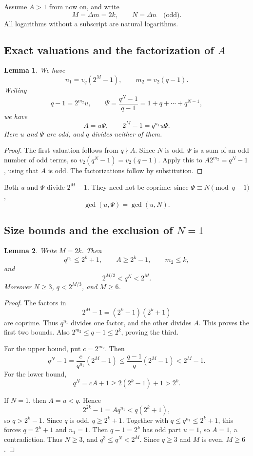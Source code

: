 \documentclass[11pt]{article}
\newtheorem{lemma}{Lemma}
\begin{document}
Assume $A>1$ from now on, and write
\[
M=\Delta m=2k,\qquad N=\Delta n\quad\text{(odd)}.
\]
All logarithms without a subscript are natural logarithms.

\subsection{\texorpdfstring{Exact valuations and the factorization of $A$}{Exact valuations and the factorization of A}}

\begin{lemma}\label{lem:valuations}
We have
\[
n_1=v_q(2^M-1),\qquad m_2=v_2(q-1).
\]
Writing
\[
q-1=2^{m_2}u,\qquad
\Psi=\frac{q^N-1}{q-1}=1+q+\cdots+q^{N-1},
\]
we have
\[
\boxed{A=u\Psi,\qquad 2^M-1=q^{n_1}u\Psi.}
\]
Here $u$ and $\Psi$ are odd, and $q$ divides neither of them.
\end{lemma}
\begin{proof}
The first valuation follows from $q\nmid A$.
Since $N$ is odd, $\Psi$ is a sum of an odd number of odd terms,
so $v_2(q^N-1)=v_2(q-1)$.
Apply this to $A2^{m_2}=q^N-1$, using that $A$ is odd.
The factorizations follow by substitution.
\end{proof}

Both $u$ and $\Psi$ divide $2^M-1$. They need not be coprime:
since $\Psi\equiv N\pmod{q-1}$,
\[
\gcd(u,\Psi)=\gcd(u,N).
\]
\subsection{\texorpdfstring{Size bounds and the exclusion of $N=1$}{Size bounds and the exclusion of N=1}}

\begin{lemma}\label{lem:bounds}
Write $M=2k$. Then
\[
q^{n_1}\leq2^k+1,\qquad A\geq2^k-1,\qquad m_2\leq k,
\]
and
\[
\boxed{2^{M/2}<q^N<2^M.}
\]
Moreover $N\geq3$, $q<2^{M/3}$, and $M\geq6$.
\end{lemma}
\begin{proof}
The factors in
\[
2^M-1=(2^k-1)(2^k+1)
\]
are coprime. Thus $q^{n_1}$ divides one factor, and the other divides
$A$. This proves the first two bounds. Also
$2^{m_2}\leq q-1\leq2^k$, proving the third.

For the upper bound, put $c=2^{m_2}$. Then
\[
q^N-1=\frac{c}{q^{n_1}}(2^M-1)
 \leq\frac{q-1}{q}(2^M-1)<2^M-1.
\]
For the lower bound,
\[
q^N=cA+1\geq2(2^k-1)+1>2^k.
\]

If $N=1$, then $A=u<q$. Hence
\[
2^{2k}-1=Aq^{n_1}<q(2^k+1),
\]
so $q>2^k-1$. Since $q$ is odd, $q\geq2^k+1$.
Together with $q\leq q^{n_1}\leq2^k+1$, this forces
$q=2^k+1$ and $n_1=1$. Then $q-1=2^k$ has odd part $u=1$,
so $A=1$, a contradiction.
Thus $N\geq3$, and $q^3\leq q^N<2^M$.
Since $q\geq3$ and $M$ is even, $M\geq6$.
\end{proof}
\end{document}
